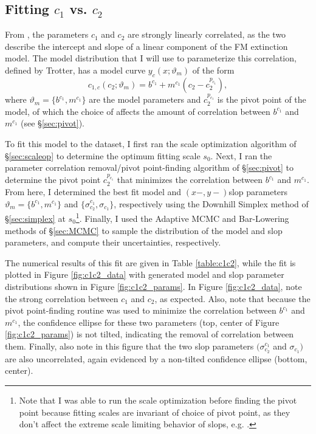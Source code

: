 \subsection{Fitting $c_1$ vs. $c_2$}
From \textcite{trotter}, the parameters $c_1$ and $c_2$ are strongly linearly correlated, as the two describe the intercept and slope of a linear component of the FM extinction model. The model distribution that I will use to parameterize this correlation, defined by Trotter, has a model curve $y_c(x;\vartheta_m)$ of the form
\begin{equation}\label{eq:c1c2model}
    c_{1,c}(c_2;\vartheta_m)=b^{c_1}+m^{c_1}\left(c_2 - c_2^{p_{c_1}}\right),
\end{equation}
where $\vartheta_m=\{b^{c_1}, m^{c_1}\}$ are the model parameters and $c_2^{p_{c_1}}$ is the pivot point of the model, of which the choice of affects the amount of correlation between $b^{c_1}$ and $m^{c_1}$ (see \S\ref{sec:pivot}).

To fit this model to the dataset, I first ran the scale optimization algorithm of \S\ref{sec:scaleop} to determine the optimum fitting scale $s_0$. Next, I ran the parameter correlation removal/pivot point-finding algorithm of \S\ref{sec:pivot} to determine the pivot point $c_2^{p_{c_1}}$ that minimizes the correlation between $b^{c_1}$ and $m^{c_1}$. From here, I determined the best fit model and $(x-,y-)$slop parameters $\vartheta_m=\{b^{c_1}, m^{c_1}\}$ and $\{\sigma_{c_2}^{c_1}, \sigma_{c_1}\}$, respectively using the Downhill Simplex method of \S\ref{sec:simplex} at $s_0$\footnote{Note that I was able to run the scale optimization before finding the pivot point because fitting scales are invariant of choice of pivot point, as they don't affect the extreme scale limiting behavior of slops, e.g. \textcite{trotter}.}. Finally, I used the Adaptive MCMC and Bar-Lowering methods of \S\ref{sec:MCMC} to sample the distribution of the model and slop parameters, and compute their uncertainties, respectively. 

The numerical results of this fit are given in Table \ref{table:c1c2}, while the fit is plotted in Figure \ref{fig:c1c2_data} with generated model and slop parameter distributions shown in Figure \ref{fig:c1c2_params}. In Figure \ref{fig:c1c2_data}, note the strong correlation between $c_1$ and $c_2$, as expected. Also, note that because the pivot point-finding routine was used to minimize the correlation between $b^{c_1}$ and $m^{c_1}$, the confidence ellipse for these two parameters (top, center of Figure \ref{fig:c1c2_params}) is not tilted, indicating the removal of correlation between them. Finally, also note in this figure that the two slop parameters $(\sigma_{c_2}^{c_1}$ and $\sigma_{c_1})$ are also uncorrelated, again evidenced by a non-tilted confidence ellipse (bottom, center).

